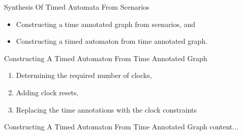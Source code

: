 \documentclass[10pt]{beamer}
\theoremstyle{plain}
\theoremstyle{definition}
\begin{document}
\begin{frame}{Synthesis Of Timed Automata From Scenarios}
\begin{itemize}
	\item Constructing a time annotated graph from scenarios, and
	\item Constructing a timed automaton from time annotated graph.
\end{itemize}
\end{frame}

\begin{frame}{Constructing A Timed Automaton From Time Annotated Graph}
	\begin{enumerate}
		\item Determining the required number of clocks,
		\item Adding clock resets,
		\item Replacing the time annotations with the clock constraints
	\end{enumerate}
\end{frame}

\begin{frame}{Constructing A Timed Automaton From Time Annotated Graph}
content...
\end{frame}
\end{document}

